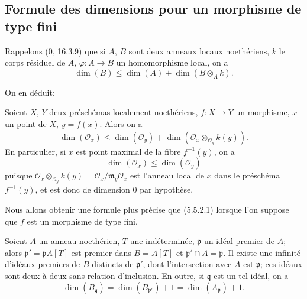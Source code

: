 \subsection{Formule des dimensions pour un morphisme de type fini}
\label{IV.2.s5.5-fr}

\begin{env}[5.5.1]
\label{IV.2.s5.5.1-fr}
Rappelons (0, 16.3.9) que si $A$, $B$ sont deux anneaux locaux noethériens,
$k$ le corps résiduel de $A$, $\varphi:A\to B$ un homomorphisme local, on a
\begin{equation}
\dim(B)\leq\dim(A)+\dim(B\otimes_A k).
\tag{5.5.1.1}\label{IV.2.s5.5.1.1-fr}
\end{equation}
\end{env}

On en déduit:

\begin{proposition}[5.5.2]
\label{IV.2.s5.5.2-fr}
Soient $X$, $Y$ deux préschémas localement noethériens, $f:X\to Y$ un
morphisme, $x$ un point de $X$, $y=f(x)$. Alors on a
\begin{equation}
\dim(\mathcal O_x)\leq\dim(\mathcal O_y)
+\dim(\mathcal O_x\otimes_{\mathcal O_y}k(y)).
\tag{5.5.2.1}\label{IV.2.s5.5.2.1-fr}
\end{equation}
En particulier, si $x$ est point maximal de la fibre $f^{-1}(y)$, on a
\begin{equation}
\dim(\mathcal O_x)\leq\dim(\mathcal O_y)
\tag{5.5.2.2}\label{IV.2.s5.5.2.2-fr}
\end{equation}
puisque $\mathcal O_x\otimes_{\mathcal O_y}k(y)
=\mathcal O_x/\mathfrak m_y\mathcal O_x$ est l'anneau local de $x$ dans le
préschéma $f^{-1}(y)$, et est donc de dimension $0$ par hypothèse.
\end{proposition}


Nous allons obtenir une formule plus précise que (5.5.2.1) lorsque l'on
suppose que $f$ est un morphisme de type fini.

\begin{proposition}[5.5.3]
\label{IV.2.s5.5.3-fr}
Soient $A$ un anneau noethérien, $T$ une indéterminée, $\mathfrak p$ un idéal
premier de $A$; alors $\mathfrak p'=\mathfrak pA[T]$ est premier dans
$B=A[T]$ et $\mathfrak p'\cap A=\mathfrak p$. Il existe une infinité
d'idéaux premiers de $B$ distincts de $\mathfrak p'$, dont l'intersection
avec $A$ est $\mathfrak p$; ces idéaux sont deux à deux sans relation
d'inclusion. En outre, si $\mathfrak q$ est un tel idéal, on a
\begin{equation}
\dim(B_{\mathfrak q})=\dim(B_{\mathfrak p'})+1
=\dim(A_{\mathfrak p})+1.
\tag{5.5.3.1}\label{IV.2.s5.5.3.1-fr}
\end{equation}
\end{proposition}

